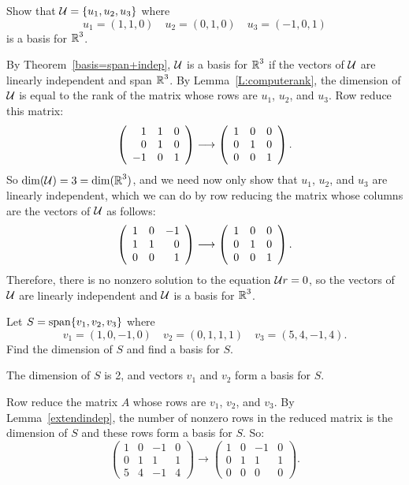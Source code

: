 \documentclass{ximera}
\begin{document}
\begin{exercise} \label{c5.5.1}
Show that ${\cal U}=\{u_1,u_2,u_3\}$ where
\[
u_1=(1,1,0) \quad u_2=(0,1,0) \quad u_3=(-1,0,1)
\]
is a basis for $\mbox{$\Bbb{R}$}^3$.

\begin{solution}

By Theorem~\ref{basis=span+indep},
${\cal U}$ is a basis for $\mbox{$\Bbb{R}$}^3$ if the vectors of ${\cal U}$ are
linearly independent and span $\mbox{$\Bbb{R}$}^3$.  By Lemma~\ref{L:computerank},
the dimension of ${\cal U}$ is equal to the rank of the matrix whose
rows are $u_1$, $u_2$, and $u_3$.  Row reduce this matrix:
\[
\left(\begin{array}{rrr} 1 & 1 & 0 \\ 0 & 1 & 0 \\ -1 & 0 & 1\end{array}\right) \longrightarrow
\left(\begin{array}{rrr} 1 & 0 & 0 \\ 0 & 1 & 0 \\ 0 & 0 & 1\end{array}\right).
\]
So $\dim({\cal U}) = 3 = \dim(\mbox{$\Bbb{R}$}^3)$, and we need now only show that
$u_1$, $u_2$, and $u_3$ are linearly independent, which we can do by
row reducing the matrix whose columns are the vectors of ${\cal U}$ as
follows:
\[
\left(\begin{array}{rrr} 1 & 0 & -1 \\ 1 & 1 & 0 \\ 0 & 0 & 1\end{array}\right) \longrightarrow
\left(\begin{array}{rrr} 1 & 0 & 0 \\ 0 & 1 & 0 \\ 0 & 0 & 1\end{array}\right).
\]
Therefore, there is no nonzero solution to the equation
${\cal U}r = 0$, so the vectors of ${\cal U}$ are linearly independent
and ${\cal U}$ is a basis for $\mbox{$\Bbb{R}$}^3$.

\end{solution}
\end{exercise}


\begin{exercise} \label{c5.5.2}
Let $S={\rm span}\{v_1,v_2,v_3\}$ where
\[
v_1=(1,0,-1,0) \quad v_2=(0,1,1,1) \quad v_3=(5,4,-1,4).
\]
Find the dimension of $S$ and find a basis for $S$.

\begin{solution}

\ans The dimension of $S$ is 2, and vectors $v_1$ and $v_2$ form a
basis for $S$.

\soln Row reduce the matrix $A$ whose rows are $v_1$, $v_2$, and $v_3$. 
By Lemma~\ref{extendindep}, the number
of nonzero rows in the reduced matrix is the dimension of $S$ and these
rows form a basis for $S$.  So:
\[
\left(\begin{array}{rrrr} 1 & 0 & -1 & 0 \\ 0 & 1 & 1 & 1 \\ 5
& 4 & -1 & 4 \end{array}\right) \longrightarrow \left(\begin{array}
{rrrr} 1& 0 & -1 & 0 \\ 0 & 1 & 1 & 1 \\ 0 & 0 & 0 & 0
\end{array}\right).
\]

\end{solution}
\end{exercise}
\end{document}
